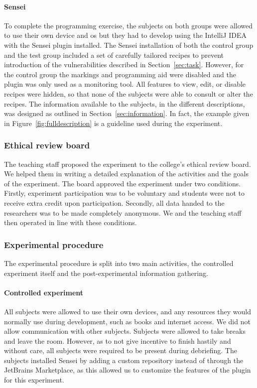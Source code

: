\paragraph{Sensei}
To complete the programming exercise, the subjects on both groups were allowed to use their own device and \gls{os} but they had to develop using the IntelliJ IDEA with the Sensei plugin installed.
The Sensei installation of both the control group and the test group included a set of carefully tailored recipes to prevent introduction of the vulnerabilities described in Section~\ref{sec:task}.
However, for the control group the markings and programming aid were disabled and the plugin was only used as a monitoring tool.
All features to view, edit, or disable recipes were hidden, so that none of the subjects were able to consult or alter the recipes.
The information available to the subjects, in the different descriptions, was designed as outlined in Section~\ref{sec:information}.
In fact, the example given in Figure~\ref{fig:fulldescription} is a guideline used during the experiment.

\subsubsection{Ethical review board}
The teaching staff proposed the experiment to the college's ethical review board.
We helped them in writing a detailed explanation of the activities and the goals of the experiment.
The board approved the experiment under two conditions.
Firstly, experiment participation was to be voluntary and students were not to receive extra credit upon participation.
Secondly, all data handed to the researchers was to be made completely anonymous.
We and the teaching staff then operated in line with these conditions.

\subsubsection{Experimental procedure}
The experimental procedure is split into two main activities, the controlled experiment itself and the post-experimental information gathering.

\paragraph{Controlled experiment}
All subjects were allowed to use their own devices, and any resources they would normally use during development, such as books and internet access.
We did not allow communication with other subjects.
Subjects were allowed to take breaks and leave the room.
However, as to not give incentive to finish hastily and without care, all subjects were required to be present during debriefing.
The subjects installed Sensei by adding a custom repository instead of through the JetBrains Marketplace, as this allowed us to customize the features of the plugin for this experiment.

